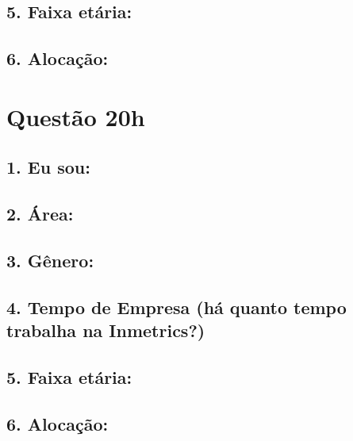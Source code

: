 \documentclass[]{book}
\begin{document}
\hypertarget{faixa-etaria-59}{%
\subsection{5. Faixa etária:}\label{faixa-etaria-59}}

\hypertarget{alocacao-59}{%
\subsection{6. Alocação:}\label{alocacao-59}}

\hypertarget{questao-20h}{%
\section{Questão 20h}\label{questao-20h}}

\hypertarget{eu-sou-60}{%
\subsection{1. Eu sou:}\label{eu-sou-60}}

\hypertarget{area-60}{%
\subsection{2. Área:}\label{area-60}}

\hypertarget{genero-60}{%
\subsection{3. Gênero:}\label{genero-60}}

\hypertarget{tempo-de-empresa-ha-quanto-tempo-trabalha-na-inmetrics-60}{%
\subsection{4. Tempo de Empresa (há quanto tempo trabalha na Inmetrics?)}\label{tempo-de-empresa-ha-quanto-tempo-trabalha-na-inmetrics-60}}

\hypertarget{faixa-etaria-60}{%
\subsection{5. Faixa etária:}\label{faixa-etaria-60}}

\hypertarget{alocacao-60}{%
\subsection{6. Alocação:}\label{alocacao-60}}
\end{document}
